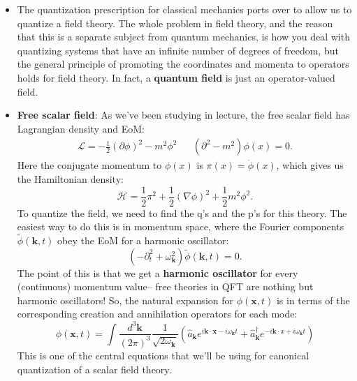 \documentclass[12pt, oneside]{article}   	%
\theoremstyle{definition}
\begin{document}
\begin{itemize}
	
	\item The quantization prescription for classical mechanics ports over to allow us to quantize a field theory. The whole problem in field theory, and the reason that this is a separate subject from quantum mechanics, is how you deal with quantizing systems that have an infinite number of degrees of freedom, but the general principle of promoting the coordinates and momenta to operators holds for field theory. In fact, a \textbf{quantum field} is just an operator-valued field. 
	
	
	\item \textbf{Free scalar field}: As we've been studying in lecture, the free scalar field has Lagrangian density and EoM:
	\begin{align}
		\mathcal L = -\frac{1}{2} (\partial\phi)^2 - m^2 \phi^2 && (\partial^2 - m^2)\phi(x) = 0.
	\end{align}
	Here the conjugate momentum to $\phi(x)$ is $\pi(x) = \dot{\phi}(x)$, which gives us the Hamiltonian density:
	\begin{equation}
		\mathcal H = \frac{1}{2} \pi^2 + \frac{1}{2} (\nabla \phi)^2 + \frac{1}{2} m^2 \phi^2. 
	\end{equation}
	To quantize the field, we need to find the q's and the p's for this theory. The easiest way to do this is in momentum space, where the Fourier components $\tilde\phi(\bm k, t)$ obey the EoM for a harmonic oscillator:
	\begin{equation}
		(-\partial_t^2 + \omega_{\bm k}^2)\tilde\phi(\bm k, t) = 0.
	\end{equation}
	The point of this is that we get a \textbf{harmonic oscillator} for every (continuous) momentum value-- free theories in QFT are nothing but harmonic oscillators! So, the natural expansion for $\phi(\bm x, t)$ is in terms of the corresponding creation and annihilation operators for each mode:
	\begin{equation}
		\phi(\bm x, t) = \int \frac{d^3\bm k}{(2\pi)^3} \frac{1}{\sqrt{2\omega_{\bm k}}} \left(\hat{a}_{\bm k} e^{i\bm k\cdot\bm x - i\omega_{\bm k} t} + \hat{a}^\dagger_{\bm k} e^{-i\bm k\cdot x + i\omega_{\bm k} t}\right)
	\end{equation}
	This is one of the central equations that we'll be using for canonical quantization of a scalar field theory. 
	

\end{itemize}
\end{document}
